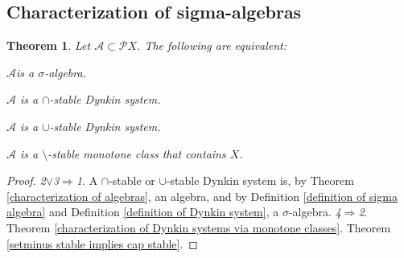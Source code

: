 \documentclass[11pt, a4paper, openany]{book}
\newtheorem{thm}{Theorem}\newtheorem{lem}{Lemma}\newtheorem{crl}{Corollary}
\theoremstyle{definition}
\newenvironment{tight_enumerate}{\begin{enumerate}\itemsep -0.2em}{\end{enumerate}}
\begin{document}
\subsection{Characterization of sigma-algebras}
    \begin{thm}\label{characterization of sigma-algebras via Dynkin systems and monotone classes}
        Let $\mathscr{A}\subset\mathscr{P}X$. The following are equivalent:
        \begin{tight_enumerate}
            \item $\mathscr{A}$is a $\sigma$-algebra.
            \item $\mathscr{A}$ is a $\cap$-stable Dynkin system.
            \item $\mathscr{A}$ is a $\cup$-stable Dynkin system.
            \item $\mathscr{A}$ is a $\setminus$-stable monotone class that contains $X$.
        \end{tight_enumerate}
    \end{thm}
    \begin{proof}
        \textit{2}$\vee$\textit{3}$\Rightarrow$\textit{1}. A $\cap$-stable or $\cup$-stable Dynkin system is, by Theorem \ref{characterization of algebras}, an algebra, and by Definition \ref{definition of sigma algebra} and Definition \ref{definition of Dynkin system}, a $\sigma$-algebra.
        \quad
        \textit{4}$\Rightarrow$\textit{2}. Theorem \ref{characterization of Dynkin systems via monotone classes}. Theorem \ref{setminus stable implies cap stable}.
    \end{proof}
\end{document}
